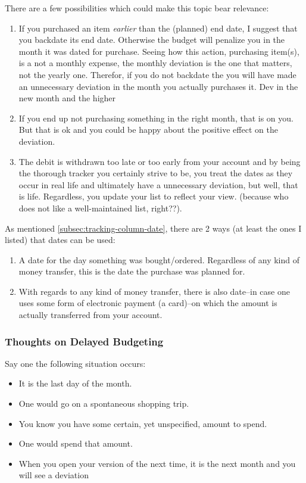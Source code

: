 There are a few possibilities which could make this topic bear relevance:
\begin{enumerate}
	\item If you purchased an item \emph{earlier} than the (planned) end date, I suggest that you backdate its end date.
	Otherwise the budget will penalize you in the month it was dated for purchase.
	Seeing how this action, \ie purchasing item(s), is a not a monthly expense, the monthly deviation is the one that matters, not the yearly one.
	Therefor, if you do not backdate the you will have made an unnecessary deviation in the month you actually purchases it.
	Dev in the new month and the higher 
	\item If you end up not purchasing something in the right month, that is on you.
	But that is ok and you could be happy about the positive effect on the deviation.
	\item The debit is withdrawn too late or too early from your account and by being the thorough tracker you certainly strive to be, you treat the dates as they occur in real life and ultimately have a unnecessary deviation, but well, that is life.
	Regardless, you update your list to reflect your view. (because who does not like a well-maintained list, right??). 
\end{enumerate}

As mentioned \autoref{subsec:tracking-column-date}, there are 2 ways (at least the ones I listed) that dates can be used:
\begin{enumerate}
	\item A date for the day something was bought/ordered.
	Regardless of any kind of money transfer, this is the date the purchase was planned for.
	\item With regards to any kind of money transfer, there is also date--in case one uses some form of electronic payment (\eg a card)--on which the amount is actually transferred from your account.
\end{enumerate}

\subsubsection{Thoughts on Delayed Budgeting}
\label{subsubsec:thoughts-delayed-budgeting}

Say one the following situation occurs:
\begin{itemize}
	\item It is the last day of the month.
	\item One would go on a spontaneous shopping trip.
	\item You know you have some certain, yet unspecified, amount to spend.
	\item One would spend that amount.
	\item When you open your version of \tfn the next time, it is the next month and you will see a deviation
\end{itemize}

